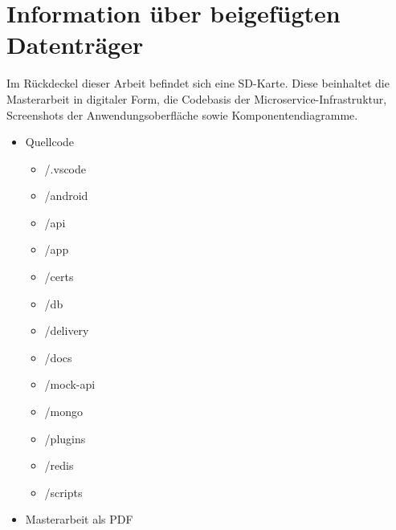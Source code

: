 \chapter{Information über beigefügten Datenträger}
\label{chap:informationueberbeigefuegtendatentraeger}
Im Rückdeckel dieser Arbeit befindet sich eine SD-Karte. Diese beinhaltet
die Masterarbeit in digitaler Form, die Codebasis der Microservice-Infrastruktur,
Screenshots der Anwendungsoberfläche sowie Komponentendiagramme.

\begin{itemize}[noitemsep,nolistsep]
    \item Quellcode
    \begin{itemize}[noitemsep,nolistsep]
        \item /.vscode
        \item /android
        \item /api
        \item /app
        \item /certs
        \item /db
        \item /delivery
        \item /docs
        \item /mock-api
        \item /mongo
        \item /plugins
        \item /redis
        \item /scripts
    \end{itemize}
    \item Masterarbeit als PDF
\end{itemize}
